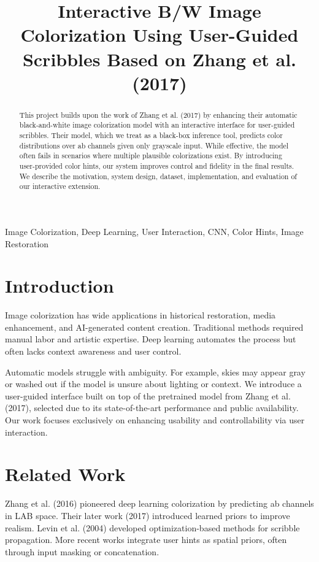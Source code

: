 \documentclass[10pt,conference]{IEEEtran}
\title{Interactive B/W Image Colorization Using User-Guided Scribbles Based on Zhang et al. (2017)}
\author{
  \IEEEauthorblockN{Hantz Brunet Guerrier, Max Ally W. Theresias}
  \IEEEauthorblockA{IBPI\\
  Yuan Ze University\\
  s1113534, s1113535}
}
\begin{document}
\maketitle

\begin{abstract}
This project builds upon the work of Zhang et al. (2017) by enhancing their automatic black-and-white image colorization model with an interactive interface for user-guided scribbles. Their model, which we treat as a black-box inference tool, predicts color distributions over ab channels given only grayscale input. While effective, the model often fails in scenarios where multiple plausible colorizations exist. By introducing user-provided color hints, our system improves control and fidelity in the final results. We describe the motivation, system design, dataset, implementation, and evaluation of our interactive extension.
\end{abstract}

\begin{IEEEkeywords}
Image Colorization, Deep Learning, User Interaction, CNN, Color Hints, Image Restoration
\end{IEEEkeywords}

\section{Introduction}
Image colorization has wide applications in historical restoration, media enhancement, and AI-generated content creation. Traditional methods required manual labor and artistic expertise. Deep learning automates the process but often lacks context awareness and user control.

Automatic models struggle with ambiguity. For example, skies may appear gray or washed out if the model is unsure about lighting or context. We introduce a user-guided interface built on top of the pretrained model from Zhang et al. (2017), selected due to its state-of-the-art performance and public availability. Our work focuses exclusively on enhancing usability and controllability via user interaction.

\section{Related Work}
Zhang et al. (2016) pioneered deep learning colorization by predicting ab channels in LAB space. Their later work (2017) introduced learned priors to improve realism. Levin et al. (2004) developed optimization-based methods for scribble propagation. More recent works integrate user hints as spatial priors, often through input masking or concatenation.
\end{document}
